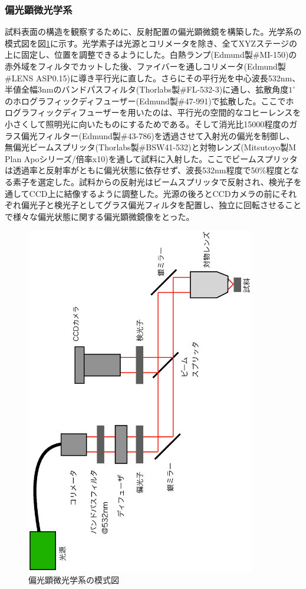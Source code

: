 \subsubsection{偏光顕微光学系}
試料表面の構造を観察するために、反射配置の偏光顕微鏡を構築した。光学系の模式図を図\ref{fig:microscope}に示す。光学素子は光源とコリメータを除き、全てXYZステージの上に固定し、位置を調整できるようにした。白熱ランプ(Edmund製\#MI-150)の赤外域をフィルタでカットした後、ファイバーを通しコリメータ(Edmund製\#LENS ASP0.15)に導き平行光に直した。さらにその平行光を中心波長532nm、半値全幅3nmのバンドパスフィルタ(Thorlabs製\#FL-532-3)に通し、拡散角度$1^\circ$のホログラフィックディフューザー(Edmund製\#47-991)で拡散した。ここでホログラフィックディフューザーを用いたのは、平行光の空間的なコヒーレンスを小さくして照明光に向いたものにするためである。そして消光比15000程度のガラス偏光フィルター(Edmund製\#43-786)を透過させて入射光の偏光を制御し、無偏光ビームスプリッタ(Thorlabs製\#BSW41-532)と対物レンズ(Mitsutoyo製M Plan Apoシリーズ/倍率x10)を通して試料に入射した。ここでビームスプリッタは透過率と反射率がともに偏光状態に依存せず、波長532nm程度で50\%程度となる素子を選定した。試料からの反射光はビームスプリッタで反射され、検光子を通してCCD上に結像するように調整した。光源の後ろとCCDカメラの前にそれぞれ偏光子と検光子としてグラス偏光フィルタを配置し、独立に回転させることで様々な偏光状態に関する偏光顕微鏡像をとった。
\begin{figure}[htb]
  \begin{center}
   \includegraphics[width=100mm,angle=270]{microscope.eps}
  \end{center}
  \caption{偏光顕微光学系の模式図}
  \label{fig:microscope}
\end{figure}

